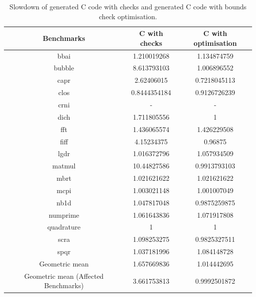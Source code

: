 \begin{table}[htbp]
\centering
\begin{tabular}{|c|c|c|}
\hline
Benchmarks                           & C with checks & C with optimisation \\ \hline
bbai                                 & 1.210019268   & 1.134874759         \\ \hline
bubble                               & 8.613793103   & 1.006896552         \\ \hline
capr                                 & 2.62406015    & 0.7218045113        \\ \hline
clos                                 & 0.8444354184  & 0.9126726239        \\ \hline
crni                                 & -             & -                   \\ \hline
dich                                 & 1.711805556   & 1                   \\ \hline
fft                                  & 1.436065574   & 1.426229508         \\ \hline
fiff                                 & 4.15234375    & 0.96875             \\ \hline
lgdr                                 & 1.016372796   & 1.057934509         \\ \hline
matmul                               & 10.44827586   & 0.9913793103        \\ \hline
mbrt                                 & 1.021621622   & 1.021621622         \\ \hline
mcpi                                 & 1.003021148   & 1.001007049         \\ \hline
nb1d                                 & 1.047817048   & 0.9875259875        \\ \hline
numprime                             & 1.061643836   & 1.071917808         \\ \hline
quadrature                           & 1             & 1                   \\ \hline
scra                                 & 1.098253275   & 0.9825327511        \\ \hline
spqr                                 & 1.037181996   & 1.084148728         \\ \hline
Geometric mean                       & 1.657669836   & 1.014442695         \\ \hline
Geometric mean (Affected Benchmarks) & 3.661753813   & 0.9992501872        \\ \hline
\end{tabular}
\caption{Slowdown of generated C code with checks and generated C code with bounds check optimisation. }
\label{tab:CwvsCbc}
\end{table}

